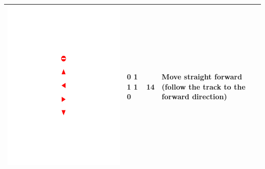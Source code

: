 \documentclass[conference]{IEEEtran}
\begin{document}
\begin{table}[!h]
\begin{tabular}{|c|C{1.5cm}|C{1.5cm}|C{2.3cm}|}
				\begin{minipage}{.075\textwidth}\includegraphics[scale=.5,trim=9.1cm 16cm 9.5cm 10.5cm,clip]{signs.pdf}\end{minipage}	& 0 1 1 1 0	& 14 & Move straight forward (follow the track to the forward direction) \\ \hline

\end{tabular}
\end{table}
\end{document}
